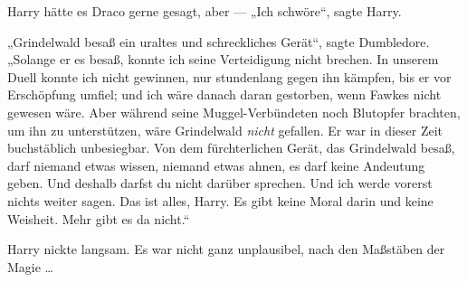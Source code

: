 Harry hätte es Draco gerne gesagt, aber —
„Ich schwöre“, sagte Harry.

„Grindelwald besaß ein uraltes und schreckliches Gerät“, sagte Dumbledore.
„Solange er es besaß, konnte ich seine Verteidigung nicht brechen. In unserem Duell konnte ich nicht gewinnen, nur stundenlang gegen ihn kämpfen, bis er vor Erschöpfung umfiel; und ich wäre danach daran gestorben, wenn Fawkes nicht gewesen wäre. Aber während seine Muggel-Verbündeten noch Blutopfer brachten, um ihn zu unterstützen, wäre Grindelwald \emph{nicht} gefallen. Er war in dieser Zeit buchstäblich unbesiegbar. Von dem fürchterlichen Gerät, das Grindelwald besaß, darf niemand etwas wissen, niemand etwas ahnen, es darf keine Andeutung geben. Und deshalb darfst du nicht darüber sprechen. Und ich werde vorerst nichts weiter sagen. Das ist alles, Harry. Es gibt keine Moral darin und keine Weisheit. Mehr gibt es da nicht.“

Harry nickte langsam. Es war nicht ganz unplausibel, nach den Maßstäben der Magie …

